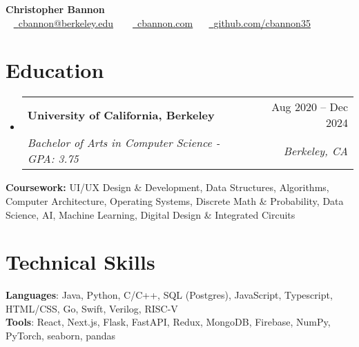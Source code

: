 \documentclass[letterpaper,11pt]{article}
\makeatletter
\newcommand{\resumeSubheading}[4]{
  \vspace{-2pt}\item
    \begin{tabular*}{0.97\textwidth}[t]{l@{\extracolsep{\fill}}r}
      \textbf{#1} & #2 \\
      \textit{\small#3} & \textit{\small #4} \\
    \end{tabular*}\vspace{-6pt}
}
\newcommand{\resumeSubHeadingListStart}{\begin{itemize}[leftmargin=0.15in, label={}]}
\newcommand{\resumeSubHeadingListEnd}{\end{itemize}}
\makeatother
\begin{document}
\begin{center}
    {\Huge \textbf{Christopher Bannon}} \\ \vspace{6pt}
    ~ \small \href{mailto:cbannon@berkeley.edu}{\raisebox{-0.2\height}\faEnvelope\  \underline{cbannon@berkeley.edu}} ~
    ~ \small \href{https://cbannon.com}{\raisebox{-0.2\height}\faLink\ \underline{cbannon.com}} ~
    ~\href{https://github.com/cbannon35}{\raisebox{-0.2\height}\faGithub\ \underline{github.com/cbannon35}}~
    \vspace{-8pt}
\end{center}


\section{Education}
  \resumeSubHeadingListStart
    \resumeSubheading
      {University of California, Berkeley}{Aug 2020 -- Dec 2024}
      {Bachelor of Arts in Computer Science - GPA: 3.75}{Berkeley, CA}
  \resumeSubHeadingListEnd
  \begin{itemize}[leftmargin=0.15in, label={}]
    \small{\item{\textbf{Coursework:} UI/UX Design \& Development, Data Structures, Algorithms, Computer Architecture, Operating Systems, Discrete Math \& Probability, Data Science, AI, Machine Learning, Digital Design \& Integrated Circuits
    }}
  \end{itemize}

\section{Technical Skills}
\begin{itemize}[leftmargin=0.15in, label={}]
   \small{\item{
    \textbf{Languages}{: Java, Python, C/C++, SQL (Postgres), JavaScript, Typescript, HTML/CSS, Go, Swift, Verilog, RISC-V} \\
    \textbf{Tools}{: React, Next.js, Flask, FastAPI, Redux, MongoDB, Firebase, NumPy, PyTorch, seaborn, pandas} \\
   }}
\end{itemize}
\end{document}
